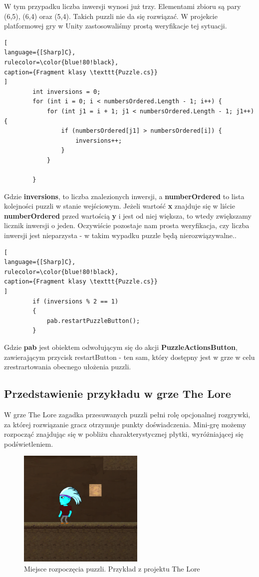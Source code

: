 \documentclass[oneside,polski,logo]{amuthesis}
\begin{document}
W tym przypadku liczba inwersji wynosi już trzy. Elementami zbioru są pary (6,5), (6,4) oraz (5,4). Takich puzzli nie da się rozwiązać. 
W projekcie platformowej gry w Unity zastosowaliśmy prostą weryfikacje tej sytuacji. 

\begin{lstlisting}[
language={[Sharp]C},
rulecolor=\color{blue!80!black},
caption={Fragment klasy \texttt{Puzzle.cs}}
]
        int inversions = 0;
        for (int i = 0; i < numbersOrdered.Length - 1; i++) {
            for (int j1 = i + 1; j1 < numbersOrdered.Length - 1; j1++) {
                if (numbersOrdered[j1] > numbersOrdered[i]) {
                    inversions++;
                }
            }
            
        }
\end{lstlisting}
Gdzie \textbf{inversions}, to liczba znalezionych inwersji, a \textbf{numberOrdered} to lista kolejności puzzli w stanie wejściowym. Jeżeli wartość \textbf{x} znajduje się w liście \textbf{numberOrdered} przed wartością \textbf{y} i jest od niej większa, to wtedy zwiększamy licznik inwersji o jeden.
Oczywiście pozostaje nam prosta weryfikacja, czy liczba inwersji jest nieparzysta - w takim wypadku puzzle będą nierozwiązywalne..
\begin{lstlisting}[
language={[Sharp]C},
rulecolor=\color{blue!80!black},
caption={Fragment klasy \texttt{Puzzle.cs}}
]
        if (inversions % 2 == 1)
        {
            pab.restartPuzzleButton();
        }
\end{lstlisting}

Gdzie \textbf{pab} jest obiektem odwołującym się do akcji \textbf{PuzzleActionsButton}, zawierającym przycisk restartButton - ten sam, który dostępny jest w grze w celu zrestrartowania obecnego ułożenia puzzli.
\subsection{Przedstawienie przykładu w grze The Lore}
W grze The Lore zagadka przesuwanych puzzli pełni rolę opcjonalnej rozgrywki, za której rozwiązanie gracz otrzymuje punkty doświadczenia. Mini-grę możemy rozpocząć znajdując się w pobliżu charakterystycznej płytki, wyróżniającej się podświetleniem.
\begin{figure}[h]
	\centering
	\includegraphics[width=6cm]{images/tyrek/the_lore_puzzle_lvl1.png}
	\caption{Miejsce rozpoczęcia puzzli. Przykład z projektu The Lore}
\end{figure}
\end{document}
